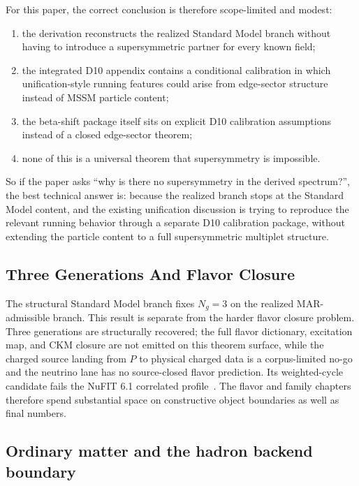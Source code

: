 \documentclass[11pt]{article}
\begin{document}
For this paper, the correct conclusion is therefore scope-limited and modest:
\begin{enumerate}[leftmargin=2em]
\item the derivation reconstructs the realized Standard Model branch without having to
introduce a supersymmetric partner for every known field;
\item the integrated D10 appendix contains a conditional calibration in which unification-style running
features could arise from edge-sector structure instead of MSSM particle content;
\item the beta-shift package itself sits on explicit D10 calibration assumptions instead of a closed edge-sector theorem;
\item none of this is a universal theorem that supersymmetry is impossible.
\end{enumerate}

So if the paper asks ``why is there no supersymmetry in the derived spectrum?'', the best
technical answer is: because the realized branch stops at the Standard
Model content, and the existing unification discussion is trying to reproduce the relevant
running behavior through a separate D10 calibration package, without extending the particle content to a full
supersymmetric multiplet structure.

\subsection{Three Generations And Flavor Closure}

The structural Standard Model branch fixes \(N_g=3\) on the realized MAR-admissible
branch. This result is separate from the harder flavor
closure problem. Three generations are structurally recovered; the full flavor dictionary,
excitation map, and CKM closure are not emitted on this theorem surface, while the charged source landing from \(P\) to physical charged data is a corpus-limited no-go and the neutrino
lane has no source-closed flavor prediction. Its weighted-cycle candidate fails the NuFIT 6.1
correlated profile~\cite{nufit61}.
The flavor and family chapters therefore spend substantial space on
constructive object boundaries as well as final numbers.

\subsection{Ordinary matter and the hadron backend boundary}
\end{document}
